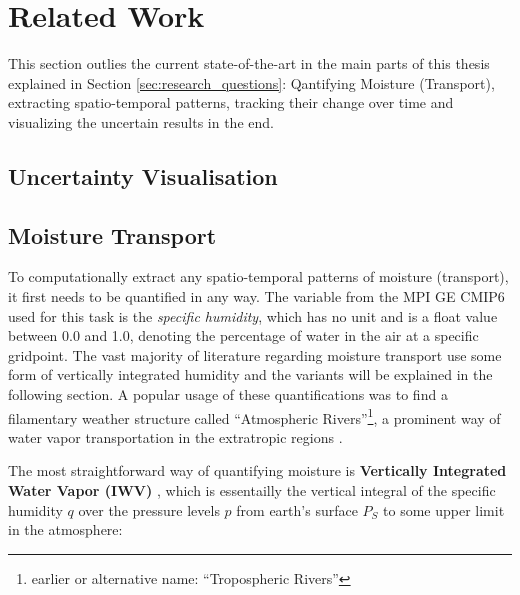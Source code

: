 \chapter{Related Work}
\label{ch:related_work}

This section outlies the current state-of-the-art in the main parts of this thesis explained in Section \ref{sec:research_questions}: Qantifying Moisture (Transport), extracting spatio-temporal patterns, tracking their change over time and visualizing the uncertain results in the end.


\section{Uncertainty Visualisation}

\section{Moisture Transport}


To computationally extract any spatio-temporal patterns of moisture (transport), it first needs to be quantified in any way.
The variable from the MPI GE CMIP6 used for this task is the \textit{specific humidity}, which has no unit and is a float value between 0.0 and 1.0, denoting the percentage of water in the air at a specific gridpoint. 
The vast majority of literature regarding moisture transport use some form of vertically integrated humidity and the variants will be explained in the following section.  
A popular usage of these quantifications was to find a filamentary weather structure called \enquote{Atmospheric Rivers}\footnote{earlier or alternative name: \enquote{Tropospheric Rivers}}, a prominent way of water vapor transportation in the extratropic regions \cite{gimeno_atmospheric_2014}. 


The most straightforward way of quantifying moisture is \textbf{Vertically Integrated Water Vapor (IWV)} \cite{gimeno_atmospheric_2014, schluessel_atmospheric_1990, bao_interpretation_2006, neiman_meteorological_2008, zhao_lagrangian_2021}, which is essentailly the vertical integral of the specific humidity $q$ over the pressure levels $p$ from earth's surface $P_S$ to some upper limit in the atmosphere:


